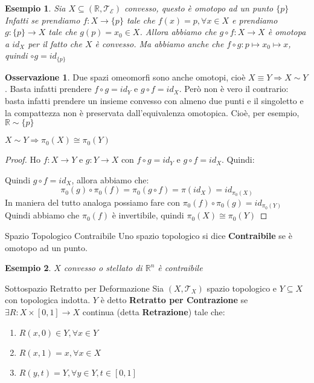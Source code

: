 \documentclass[11pt,a4paper,twoside]{article}
\newtheorem{es}{Esempio}
\theoremstyle{definition}
\newtheorem*{oss}{Osservazione}
\begin{document}
\begin{es}
	Sia $X \subseteq (\mathbb R, \mathcal T_\mathcal E)$ convesso, questo è omotopo ad un punto $\{p\}$\\
	Infatti se prendiamo $f:X \to \{p\}$ tale che $f(x) = p, \forall x \in X$ e prendiamo $g:\{p\} \to X$ tale che $g(p) = x_0 \in X$. Allora abbiamo che $g \circ f:X \to X$ è omotopa a $id_X$ per il fatto che $X$ è convesso. Ma abbiamo anche che $f \circ g: p \mapsto x_0 \mapsto x$, quindi $ \circ g = id_{\{p\}}$
\end{es}

\begin{oss}
	Due spazi omeomorfi sono anche omotopi, cioè $X \equiv Y \Rightarrow X \sim Y$. Basta infatti prendere $f\circ g = id_Y$ e $g \circ f = id_X$. Però non è vero il contrario: basta infatti prendere un insieme convesso con almeno due punti e il singoletto e la compattezza non è preservata dall'equivalenza omotopica. Cioè, per esempio, $\mathbb R \sim \{p\}$
\end{oss}

\begin{prop}{}{}
	$X \sim Y \Rightarrow \pi_0(X) \cong \pi_0(Y)$
\end{prop}

\begin{proof}
	Ho $f:X \to Y$ e $g:Y \to X$ con $f\circ g = id_Y$ e $g \circ f = id_X$. Quindi:
	\begin{center}
	\end{center}
	Quindi $g \circ f = id_X$, allora abbiamo che:
	\[ \pi_0(g) \circ \pi_0(f) = \pi_0(g \circ f) = \pi(id_X) = id_{\pi_0(X)} \]
	In maniera del tutto analoga possiamo fare con $\pi_0(f) \circ \pi_0(g) = id_{\pi_0(Y)}$
	Quindi abbiamo che $\pi_0(f)$ è invertibile, quindi $\pi_0(X)\cong \pi_0(Y)$
\end{proof}

\begin{defn}{Spazio Topologico Contraibile}{}
	Uno spazio topologico si dice \textbf{Contraibile} se è omotopo ad un punto.
\end{defn}

\begin{es}
	$X$ convesso o stellato di $\mathbb R^n$ è contraibile
\end{es}

\begin{defn}{Sottospazio Retratto per Deformazione}{}
	Sia $(X, \mathcal T_X)$ spazio topologico e $Y \subseteq X$ con topologica indotta. $Y$ è detto \textbf{Retratto per Contrazione} se $\exists R:X \times [0,1] \to X$ continua (detta \textbf{Retrazione}) tale che:
	\begin{enumerate}
		\item $R(x, 0) \in Y, \forall x \in Y$
		\item $R(x, 1) = x, \forall x \in X$
		\item $R(y, t) = Y, \forall y \in Y, t \in [0,1]$
	\end{enumerate}
\end{defn}
\end{document}
